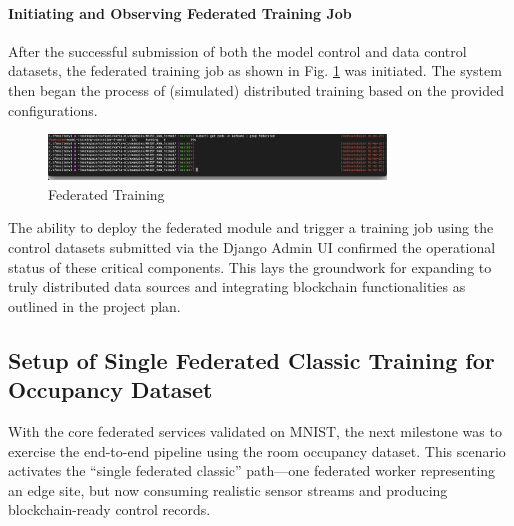 \paragraph{Initiating and Observing Federated Training Job}
After the successful submission of both the model control and data control datasets, the federated training job as shown in Fig. \ref{fig:federated_training_job} was initiated. The system then began the process of (simulated) distributed training based on the provided configurations.
\begin{figure}[h!]
    \centering
     \includegraphics[width=0.8\textwidth]{MWP-Project Report Template - BD-ML-June25/screenshots_federated/7_Federated_Training_Job_Running.png}
   \caption{Federated Training}
    \label{fig:federated_training_job}
\end{figure}

The ability to deploy the federated module and trigger a training job using the control datasets submitted via the Django Admin UI confirmed the operational status of these critical components. This lays the groundwork for expanding to truly distributed data sources and integrating blockchain functionalities as outlined in the project plan.

\subsection{Setup of Single Federated Classic Training for Occupancy Dataset}
\label{subsec:single_fed_classic_occupancy}

With the core federated services validated on MNIST, the next milestone was to exercise the end-to-end pipeline using the room occupancy dataset. This scenario activates the ``single federated classic'' path—one federated worker representing an edge site, but now consuming realistic sensor streams and producing blockchain-ready control records.

